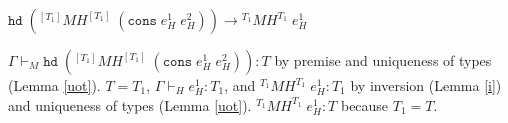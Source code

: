 \begin{case}
$\mathtt{hd}\;(^{[T_{1}]}MH^{[T_{1}]}\;(\mathtt{cons}\;e_{H}^{1}\;e_{H}^{2}))\rightarrow{^{T_{1}}M}H^{T_{1}}\;e_{H}^{1}$

$\Gamma\vdash_{M}\mathtt{hd}\;(^{[T_{1}]}MH^{[T_{1}]}\;(\mathtt{cons}\;e_{H}^{1}\;e_{H}^{2})):T$ by premise and uniqueness of types (Lemma \ref{uot}).  $T=T_{1}$, $\Gamma\vdash_{H}e_{H}^{1}:T_{1}$, and $^{T_{1}}MH^{T_{1}}\;e_{H}^{1}:T_{1}$ by inversion (Lemma \ref{i}) and uniqueness of types (Lemma \ref{uot}).  $^{T_{1}}MH^{T_{1}}\;e_{H}^{1}:T$ because $T_{1}=T$.
\end{case}